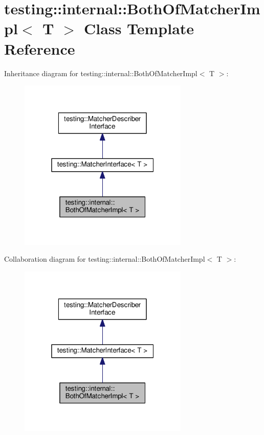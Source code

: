 \hypertarget{classtesting_1_1internal_1_1_both_of_matcher_impl}{}\section{testing\+:\+:internal\+:\+:Both\+Of\+Matcher\+Impl$<$ T $>$ Class Template Reference}
\label{classtesting_1_1internal_1_1_both_of_matcher_impl}


Inheritance diagram for testing\+:\+:internal\+:\+:Both\+Of\+Matcher\+Impl$<$ T $>$\+:
\nopagebreak
\begin{figure}[H]
\begin{center}
\leavevmode
\includegraphics[width=229pt]{classtesting_1_1internal_1_1_both_of_matcher_impl__inherit__graph}
\end{center}
\end{figure}


Collaboration diagram for testing\+:\+:internal\+:\+:Both\+Of\+Matcher\+Impl$<$ T $>$\+:
\nopagebreak
\begin{figure}[H]
\begin{center}
\leavevmode
\includegraphics[width=229pt]{classtesting_1_1internal_1_1_both_of_matcher_impl__coll__graph}
\end{center}
\end{figure}
